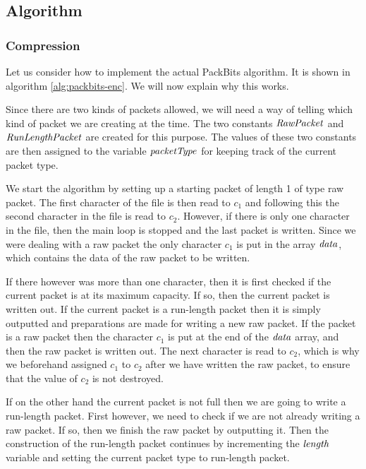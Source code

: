 \subsection{Algorithm}

\subsubsection{Compression}

Let us consider how to implement the actual PackBits \rle
algorithm. It is shown in algorithm \ref{alg:packbits-enc}. We will
now explain why this works.

Since there are two kinds of packets allowed, we will need a way of
telling which kind of packet we are creating at the time. The two
constants $\mathit{RawPacket}$ and $\mathit{RunLengthPacket}$ are created
for this purpose. The values of these two constants are then assigned
to the variable $\mathit{packetType}$ for keeping track of the current
packet type.

We start the algorithm by setting up a starting packet of length 1 of
type raw packet. The first character of the file is then read to $c_1$
and following this the second character in the file is read to
$c_2$. However, if there is only one character in the file, then the
main loop is stopped and the last packet is written. Since we were
dealing with a raw packet the only character $c_1$ is put in the array
$\mathit{data}$, which contains the data of the raw packet to be written.

If there however was more than one character, then it is first checked
if the current packet is at its maximum capacity. If so, then the
current packet is written out. If the current packet is a run-length
packet then it is simply outputted and preparations are made for
writing a new raw packet. If the packet is a raw packet then the
character $c_1$ is put at the end of the $\mathit{data}$ array, and then
the raw packet is written out. The next character is read to $c_2$,
which is why we beforehand assigned $c_1$ to $c_2$ after we have
written the raw packet, to ensure that the value of $c_2$ is not
destroyed.

If on the other hand the current packet is not full then we are going
to write a run-length packet. First however, we need to check if we
are not already writing a raw packet. If so, then we finish the raw
packet by outputting it. Then the construction of the run-length
packet continues by incrementing the $\mathit{length}$ variable and setting the
current packet type to run-length packet.


